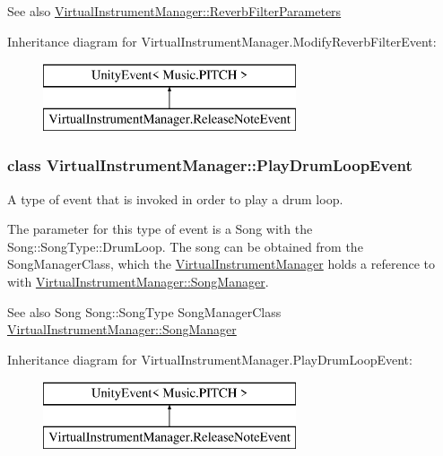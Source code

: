 \begin{DoxySeeAlso}{See also}
\hyperlink{group___event_types_struct_virtual_instrument_manager_1_1_reverb_filter_parameters}{Virtual\+Instrument\+Manager\+::\+Reverb\+Filter\+Parameters} 
\end{DoxySeeAlso}
Inheritance diagram for Virtual\+Instrument\+Manager.\+Modify\+Reverb\+Filter\+Event\+:\begin{figure}[H]
\begin{center}
\leavevmode
\includegraphics[height=2.000000cm]{group___event_types}
\end{center}
\end{figure}
\label{class_virtual_instrument_manager_1_1_play_drum_loop_event}
\subsubsection{class Virtual\+Instrument\+Manager\+:\+:Play\+Drum\+Loop\+Event}
A type of event that is invoked in order to play a drum loop. 

The parameter for this type of event is a Song with the Song\+::\+Song\+Type\+::\+Drum\+Loop. The song can be obtained from the Song\+Manager\+Class, which the \hyperlink{group___audio_management_class_virtual_instrument_manager}{Virtual\+Instrument\+Manager} holds a reference to with \hyperlink{group___audio_management_a33dae94932c10c66db76a0eebec76b01}{Virtual\+Instrument\+Manager\+::\+Song\+Manager}.

\begin{DoxySeeAlso}{See also}
Song Song\+::\+Song\+Type Song\+Manager\+Class \hyperlink{group___audio_management_a33dae94932c10c66db76a0eebec76b01}{Virtual\+Instrument\+Manager\+::\+Song\+Manager} 
\end{DoxySeeAlso}
Inheritance diagram for Virtual\+Instrument\+Manager.\+Play\+Drum\+Loop\+Event\+:\begin{figure}[H]
\begin{center}
\leavevmode
\includegraphics[height=2.000000cm]{group___event_types}
\end{center}
\end{figure}
\label{class_virtual_instrument_manager_1_1_play_note_event}
